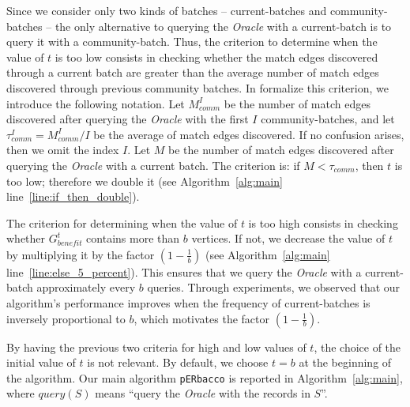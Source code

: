 \documentclass[sigconf, nonacm]{acmart}
\newcommand{\oracle}{\textit{Oracle}\xspace}
\newcommand{\window}{b}
\newcommand{\query}{\textit{query}\xspace}
\newcommand{\perbacco}{\texttt{pERbacco}\xspace}
\begin{document}
Since we consider only two kinds of batches -- current-batches and community-batches -- the only alternative to querying the \oracle with a current-batch is to query it with a community-batch. 
Thus, the criterion to determine when the value of $t$ is too low consists in checking whether the match edges discovered through a current batch are greater than the average number of match edges discovered through previous community batches. 
In formalize this criterion, we introduce the following notation. Let $M^I_{comm}$ be the number of match edges discovered after querying the \oracle with the first $I$ community-batches, and let $\tau^I_{comm} = M^I_{comm}/I$ be the average of match edges discovered. If no confusion arises, then we omit the index $I$. 
Let $M$ be the number of match edges discovered after querying the \oracle with a current batch. The criterion is: if $M < \tau_{comm}$, then $t$ is too low; therefore we double it (see Algorithm~\ref{alg:main} line~\ref{line:if_then_double}).

The criterion for determining when the value of $t$ is too high consists in checking whether $G^t_{\textit{benefit}}$ contains more than $\window$ vertices. 
If not, we decrease the value of $t$ by multiplying it by the factor $(1-\frac{1}{\window})$ (see Algorithm~\ref{alg:main} line~\ref{line:else_5_percent}). 
This ensures that we query the \oracle with a current-batch approximately every $\window$ queries. 
Through experiments, we observed that our algorithm's performance improves when the frequency of current-batches is inversely proportional to $\window$, which motivates the factor $(1-\frac{1}{\window})$.


By having the previous two criteria for high and low values of $t$, the choice of the initial value of $t$ is not relevant.
By default, we choose $t = \window$ at the beginning of the algorithm. Our main algorithm \perbacco is reported in Algorithm~\ref{alg:main}, where $\query(S)$ means ``query the \oracle with the records in $S$''.
\end{document}
